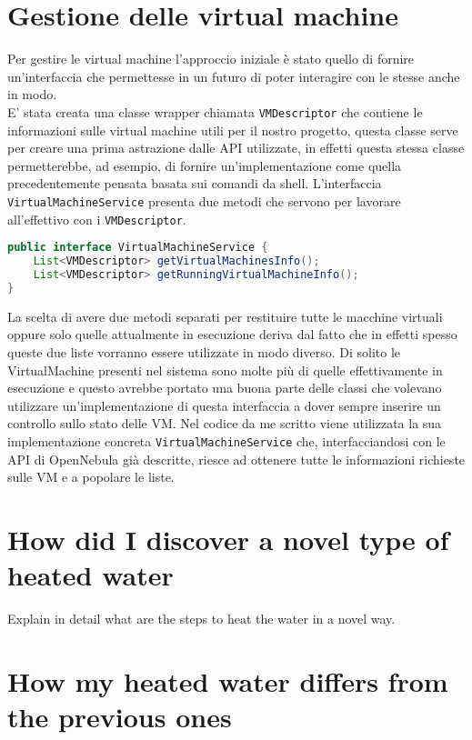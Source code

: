 \section{Gestione delle virtual machine}
Per gestire le virtual machine l'approccio iniziale è stato quello di fornire un'interfaccia che permettesse in un futuro di poter interagire con le stesse anche in modo.\\
E' stata creata una classe wrapper chiamata \texttt{VMDescriptor} che contiene le informazioni sulle virtual machine utili per il nostro progetto, questa classe serve per creare una prima astrazione dalle API utilizzate, in effetti questa stessa classe permetterebbe, ad esempio, di fornire un'implementazione come quella precedentemente pensata basata sui comandi da shell.
L'interfaccia \texttt{VirtualMachineService} presenta due metodi che servono per lavorare all'effettivo con i \texttt{VMDescriptor}.
\begin{lstlisting}[language=Java, caption=VirtualMachineService, label=code:VirtualMachineService]
public interface VirtualMachineService {
    List<VMDescriptor> getVirtualMachinesInfo();
    List<VMDescriptor> getRunningVirtualMachineInfo();
}
\end{lstlisting}
La scelta di avere due metodi separati per restituire tutte le macchine virtuali oppure solo quelle attualmente in esecuzione deriva dal fatto che in effetti spesso queste due liste vorranno essere utilizzate in modo diverso. Di solito le VirtualMachine presenti nel sistema sono molte più di quelle effettivamente in esecuzione e questo avrebbe portato una buona parte delle classi che volevano utilizzare un'implementazione di questa interfaccia a dover sempre inserire un controllo sullo stato delle VM.
Nel codice da me scritto viene utilizzata la sua implementazione concreta \texttt{VirtualMachineService} che, interfacciandosi con le API di OpenNebula già descritte, riesce ad ottenere tutte le informazioni richieste sulle VM e a popolare le liste.

\section{How did I discover a novel type of heated water}

Explain in detail what are the steps to heat the water in a novel way.

\section{How my heated water differs from the previous ones}

